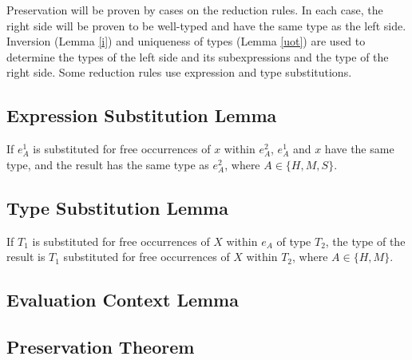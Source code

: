 Preservation will be proven by cases on the reduction rules.  In each case, the right side will be proven to be well-typed and have the same type as the left side.  Inversion (Lemma \ref{i}) and uniqueness of types (Lemma \ref{uot}) are used to determine the types of the left side and its subexpressions and the type of the right side.  Some reduction rules use expression and type substitutions.

\subsection{Expression Substitution Lemma}

If $e_{A}^{1}$ is substituted for free occurrences of $x$ within $e_{A}^{2}$, $e_{A}^{1}$ and $x$ have the same type, and the result has the same type as $e_{A}^{2}$, where $A\in\lbrace H,M,S\rbrace$.



\subsection{Type Substitution Lemma}

If $T_{1}$ is substituted for free occurrences of $X$ within $e_{A}$ of type $T_{2}$, the type of the result is $T_{1}$ substituted for free occurrences of $X$ within $T_{2}$, where $A\in\lbrace H,M\rbrace$.



\subsection{Evaluation Context Lemma}



\subsection{Preservation Theorem}


